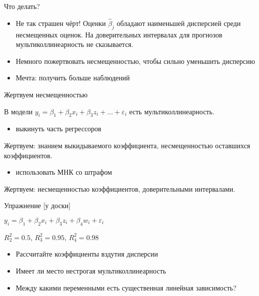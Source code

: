 \documentclass[russian,ignorenonframetext,]{beamer}
\providecommand{\tightlist}{%
  \setlength{\itemsep}{0pt}\setlength{\parskip}{0pt}}
\newcommand{\e}{\varepsilon}
\begin{document}
\begin{frame}{Что делать?}

\begin{itemize}
\tightlist
\item
  Не так страшен чёрт! Оценки \(\hat{\beta}_j\) обладают наименьшей
  дисперсией среди несмещенных оценок. На доверительных интервалах для
  прогнозов мультиколлинеарность не сказывается.
\item
  Немного пожертвовать несмещенностью, чтобы сильно уменьшить дисперсию
\item
  Мечта: получить больше наблюдений
\end{itemize}

\end{frame}

\begin{frame}{Жертвуем несмещенностью}

В модели \(y_i=\beta_1 + \beta_2 x_i +\beta_3 z_i + \ldots + \e_i\) есть
мультиколлинеарность.

\begin{itemize}
\tightlist
\item
  выкинуть часть регрессоров
\end{itemize}

Жертвуем: знанием выкидываемого коэффициента, несмещенностью оставшихся
коэффициентов.

\begin{itemize}
\tightlist
\item
  использовать МНК со штрафом
\end{itemize}

Жертвуем: несмещенностью коэффициентов, доверительными интервалами.

\end{frame}

\begin{frame}{Упражнение {[}у доски{]}}

\(y_i=\beta_1 + \beta_2 x_i + \beta_3 z_i + \beta_4 w_i + \e_i\)

\(R^2_2=0.5\), \(R^2_3=0.95\), \(R^2_4=0.98\)

\begin{itemize}
\tightlist
\item
  Рассчитайте коэффициенты вздутия дисперсии
\item
  Имеет ли место нестрогая мультиколлинеарность
\item
  Между какими переменными есть существенная линейная зависимость?
\end{itemize}

\end{frame}
\end{document}
